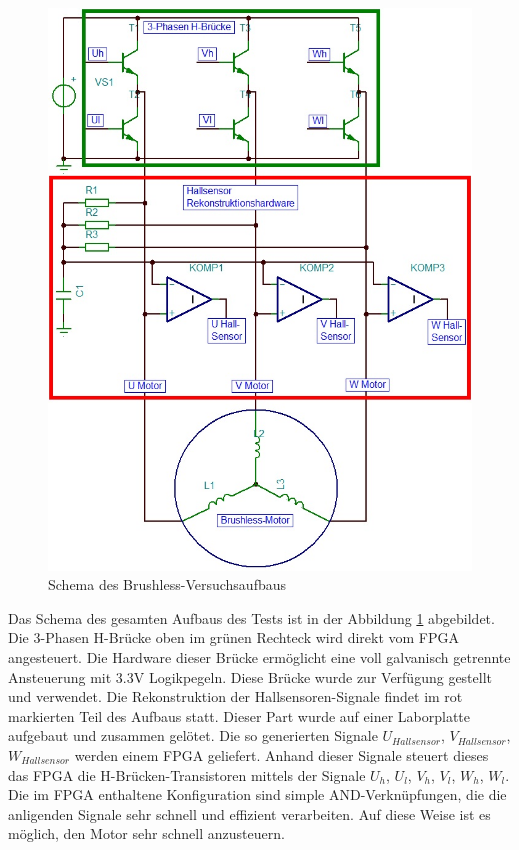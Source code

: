 \begin{figure}
	\includegraphics[scale=0.4]{Funktionstests/Bilder/MotoransteuerungSchema.jpg}
	\centering
	\caption{Schema des Brushless-Versuchsaufbaus}
\label{abb:MotoransteuerungSchema}
\end{figure}
Das Schema des gesamten Aufbaus des Tests ist in der Abbildung \ref{abb:MotoransteuerungSchema} abgebildet. Die 3-Phasen H-Brücke oben im grünen Rechteck wird direkt vom FPGA angesteuert. Die Hardware dieser Brücke ermöglicht eine voll galvanisch getrennte Ansteuerung mit 3.3V Logikpegeln. Diese Brücke wurde zur Verfügung gestellt und verwendet. Die Rekonstruktion der Hallsensoren-Signale findet im rot markierten Teil des Aufbaus statt. Dieser Part wurde auf einer Laborplatte aufgebaut und zusammen gelötet. Die so generierten Signale $U_{Hallsensor}$, $V_{Hallsensor}$, $W_{Hallsensor}$ werden einem FPGA geliefert. Anhand dieser Signale steuert dieses das FPGA die H-Brücken-Transistoren mittels der Signale $U_h$, $U_l$, $V_h$, $V_l$, $W_h$, $W_l$. Die im FPGA enthaltene Konfiguration sind simple AND-Verknüpfungen, die die anligenden Signale sehr schnell und effizient verarbeiten. Auf diese Weise ist es möglich, den Motor sehr schnell anzusteuern.\\

